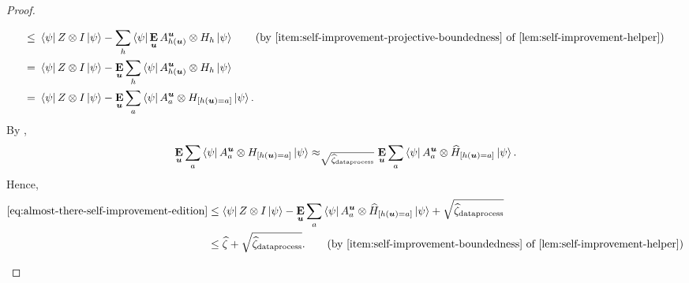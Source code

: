 \begin{proof}
\begin{enumerate}
\begin{align}
		\leq~& \bra{\psi} Z \otimes I \ket{\psi} - \sum_h \bra{\psi} \E_{\bu} A^{\bu}_{h(\bu)} \otimes H_h \ket{\psi} \tag{by \Cref{item:self-improvement-projective-boundedness} of \Cref{lem:self-improvement-helper}}\\
		=~&  \bra{\psi} Z \otimes I \ket{\psi} -\E_{\bu} \sum_h \bra{\psi}  A^{\bu}_{h(\bu)} \otimes H_h \ket{\psi}\nonumber\\
		=~&  \bra{\psi} Z \otimes I \ket{\psi} -\E_{\bu} \sum_a \bra{\psi}  A^{\bu}_{a} \otimes H_{[h(\bu)=a]} \ket{\psi}. \label{eq:almost-there-self-improvement-edition}
		\end{align}
		By ,
		\begin{equation*}
		\mathop{\bf E\/}_{\boldsymbol{u}} \sum_a \bra{\psi}  A^{\boldsymbol{u}}_{a} \otimes H_{[h(\boldsymbol{u})=a]} \ket{\psi}
		\approx_{\sqrt{\widehat{\zeta}_{\mathrm{dataprocess}}}} \mathop{\bf E\/}_{\boldsymbol{u}} \sum_a \bra{\psi}  A^{\boldsymbol{u}}_{a} \otimes \widehat{H}_{[h(\boldsymbol{u})=a]} \ket{\psi}.
		\end{equation*}
		Hence,
		\begin{align*}
		\eqref{eq:almost-there-self-improvement-edition}
		& \leq \bra{\psi} Z \otimes I \ket{\psi} -\E_{\bu} \sum_a \bra{\psi}  A^{\bu}_{a} \otimes \widehat{H}_{[h(\bu)=a]} \ket{\psi} + \sqrt{\widehat{\zeta}_{\mathrm{dataprocess}}}\\
		& \leq \widehat{\zeta} + \sqrt{\widehat{\zeta}_{\mathrm{dataprocess}}}. \tag{by \Cref{item:self-improvement-boundedness} of \Cref{lem:self-improvement-helper}}
		\end{align*}
\end{enumerate}


\end{proof}
